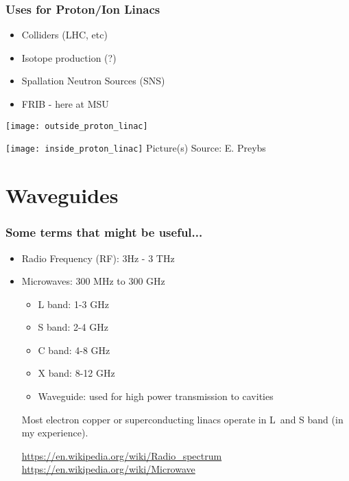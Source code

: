 \documentclass[professionalfonts,t]{beamer}
\begin{document}
\begin{frame}
	\frametitle{Uses for Proton/Ion Linacs}

\begin{minipage}{0.45\textwidth}
	\begin{itemize}
		\item Colliders (LHC, etc)
		\item Isotope production (?)
		\item Spallation Neutron Sources (SNS)
		\item FRIB - here at MSU
	\end{itemize}
	\centering

	\texttt{[image: outside\_proton\_linac]}
\end{minipage}\hfill
\begin{minipage}{0.45\textwidth}
	\centering
	\texttt{[image: inside\_proton\_linac]}
	Picture(s) Source: E. Preybs
\end{minipage}
\end{frame}



\section{Waveguides}
\begin{frame}
\frametitle{Some terms that might be useful...}
\begin{itemize}
	\item Radio Frequency (RF): 3Hz - 3 THz
	\item Microwaves: 300 MHz to 300 GHz 
	\begin{itemize}
		\item L band: 1-3 GHz
		\item S band: 2-4 GHz
		\item C band: 4-8 GHz
		\item X band: 8-12 GHz
	\item Waveguide: used for high power transmission to cavities
	\end{itemize}

\vspace{1em}

Most electron copper or superconducting linacs 
operate in L~and S band (in my experience). 

\vspace{1em}
\url{https://en.wikipedia.org/wiki/Radio_spectrum}
\url{https://en.wikipedia.org/wiki/Microwave}
\end{itemize}
\end{frame}
\end{document}

